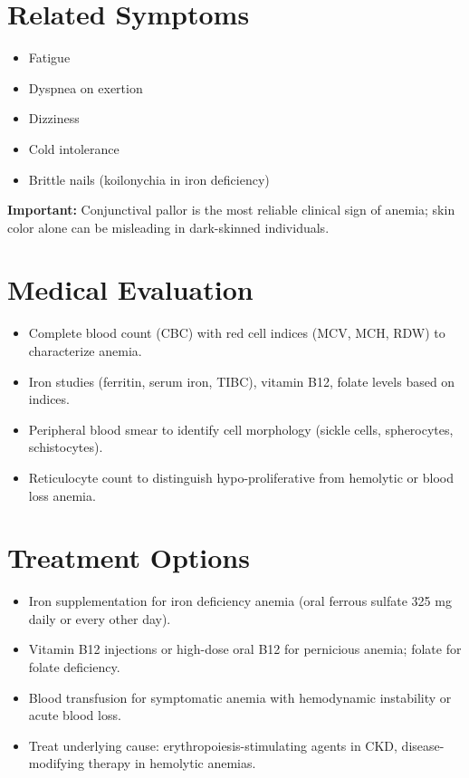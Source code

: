 \section*{Related Symptoms}
\begin{itemize}
  \item Fatigue
  \item Dyspnea on exertion
  \item Dizziness
  \item Cold intolerance
  \item Brittle nails (koilonychia in iron deficiency)
\end{itemize}
\textbf{Important:} Conjunctival pallor is the most reliable clinical sign of anemia; skin color alone can be misleading in dark-skinned individuals.

\section*{Medical Evaluation}
\begin{itemize}
  \item Complete blood count (CBC) with red cell indices (MCV, MCH, RDW) to characterize anemia.
  \item Iron studies (ferritin, serum iron, TIBC), vitamin B12, folate levels based on indices.
  \item Peripheral blood smear to identify cell morphology (sickle cells, spherocytes, schistocytes).
  \item Reticulocyte count to distinguish hypo-proliferative from hemolytic or blood loss anemia.
\end{itemize}

\section*{Treatment Options}
\begin{itemize}
  \item Iron supplementation for iron deficiency anemia (oral ferrous sulfate 325 mg daily or every other day).
  \item Vitamin B12 injections or high-dose oral B12 for pernicious anemia; folate for folate deficiency.
  \item Blood transfusion for symptomatic anemia with hemodynamic instability or acute blood loss.
  \item Treat underlying cause: erythropoiesis-stimulating agents in CKD, disease-modifying therapy in hemolytic anemias.
\end{itemize}

